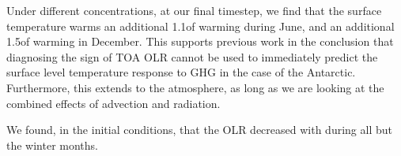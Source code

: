 \documentclass[12]{article}
\begin{document}
Under different  concentrations, at our final timestep, we find that the surface temperature warms an additional 1.1\degree of warming during June, and an additional 1.5\degree of warming in December. This supports previous work in the conclusion that diagnosing the sign of TOA OLR cannot be used to immediately predict the surface level temperature response to GHG in the case of the Antarctic. Furthermore, this extends to the atmosphere, as long as we are looking at the combined effects of advection and radiation.

We found, in the initial conditions, that the OLR decreased with  during all but the winter months. 

\pagebreak


\end{document}
